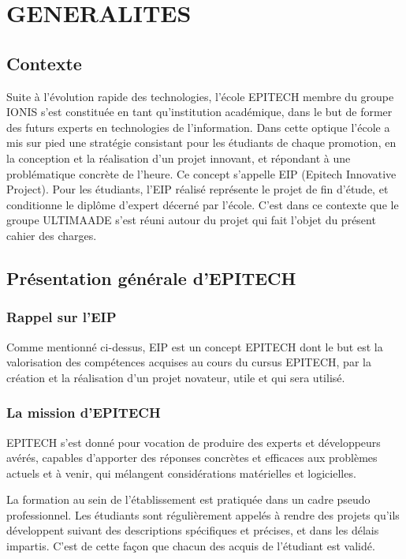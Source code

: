 \documentclass{ultimaade-fr}
\begin{document}
\chapter{GENERALITES}


\section{Contexte}

Suite à l’évolution rapide des technologies, l’école EPITECH membre du groupe IONIS s’est constituée en tant qu’institution académique, dans le but de former des futurs experts en technologies de l’information.
Dans cette optique l’école a mis sur pied une stratégie consistant pour les étudiants de chaque promotion, en la conception et la réalisation d’un projet innovant, et répondant à une problématique concrète de l’heure.
Ce concept  s’appelle  EIP  (Epitech  Innovative  Project).  Pour  les  étudiants,  l’EIP  réalisé représente le projet de fin d’étude, et conditionne le diplôme d’expert décerné par l’école. C’est dans ce contexte que le  groupe ULTIMAADE s’est réuni autour du projet qui fait l’objet du présent cahier des charges.

\vspace{20pt}

\section{Présentation générale d'EPITECH }

\subsection{Rappel sur l’EIP}
Comme mentionné ci-dessus, EIP est un concept EPITECH dont le but est la valorisation des compétences  acquises au cours du cursus EPITECH, par la création et la réalisation d'un projet novateur, utile et qui sera utilisé.

\subsection{La mission d’EPITECH}

EPITECH	s’est  donné  pour  vocation  de  produire  des  experts  et  développeurs  avérés, capables d’apporter des réponses concrètes et efficaces aux problèmes actuels et à venir, qui mélangent considérations matérielles et logicielles.

La formation au sein de l’établissement est pratiquée dans un cadre pseudo professionnel. Les étudiants sont régulièrement appelés à rendre des projets qu’ils développent suivant des descriptions spécifiques et précises, et dans les délais impartis. C’est de cette façon que chacun des acquis de l’étudiant est validé.
\end{document}
